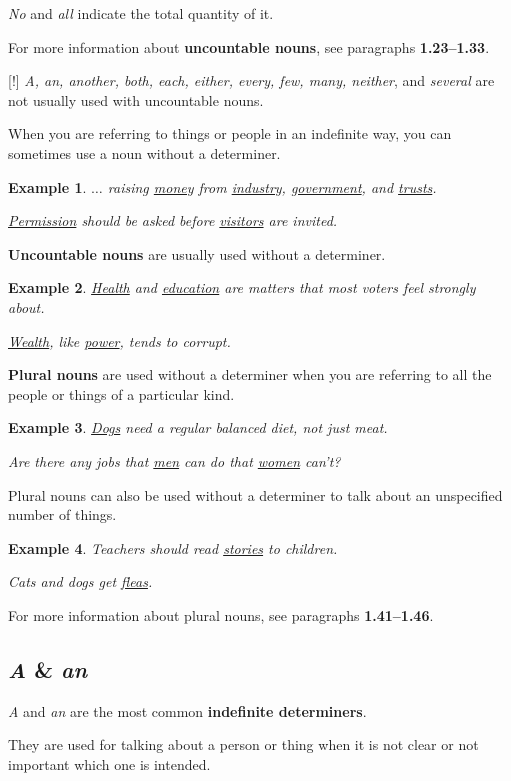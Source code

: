 \documentclass[oneside]{book}
\numberwithin{equation}{section}
\newtheorem{example}{Example}[section]
\begin{document}
\textit{No} and \textit{all} indicate the total quantity of it.

%
For more information about \textbf{uncountable nouns}, see paragraphs \textbf{1.23--1.33}.

%
\noindent{} [!] \textit{A, an, another, both, each, either, every, few, many, neither}, and \textit{several} are not usually used with uncountable nouns.

%
\noindent{} When you are referring to things or people in an indefinite way, you can sometimes use a noun without a determiner.
\begin{example}
    $\ldots$ raising \underline{money} from \underline{industry}, \underline{government}, and \underline{trusts}.
    
    \underline{Permission} should be asked before \underline{visitors} are invited.
\end{example}
\textbf{Uncountable nouns} are usually used without a determiner.
\begin{example}
    \underline{Health} and \underline{education} are matters that most voters feel strongly about.
    
    \underline{Wealth}, like \underline{power}, tends to corrupt.
\end{example}
\textbf{Plural nouns} are used without a determiner when you are referring to all the people or things of a particular kind.
\begin{example}
    \underline{Dogs} need a regular balanced diet, not just meat.
    
    Are there any jobs that \underline{men} can do that \underline{women} can't?
\end{example}
Plural nouns can also be used without a determiner to talk about an unspecified number of things.
\begin{example}
    Teachers should read \underline{stories} to children.
    
    Cats and dogs get \underline{fleas}.
\end{example}
For more information about plural nouns, see paragraphs \textbf{1.41--1.46}.

\subsection{\textit{A} \& \textit{an}}
\noindent{} \textit{A} and \textit{an} are the most common \textbf{indefinite determiners}.

They are used for talking about a person or thing when it is not clear or not important which one is intended.
\end{document}
